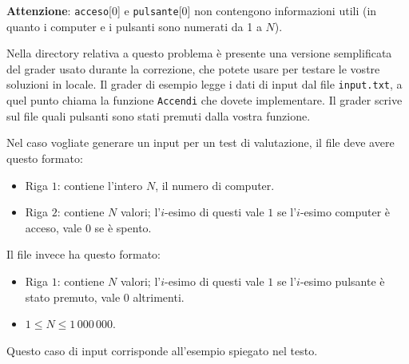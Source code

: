 \textbf{Attenzione}: \texttt{acceso}[0] e \texttt{pulsante}[0] non contengono informazioni utili (in quanto i computer e i pulsanti sono numerati da 1 a $N$).

\Grader
Nella directory relativa a questo problema è presente una versione 
semplificata del grader usato durante la correzione, che potete usare
per testare le vostre soluzioni in locale. Il grader di esempio legge
i dati di input dal file \texttt{input.txt}, a quel punto chiama la
funzione \texttt{Accendi} che dovete implementare. Il grader scrive sul file \outputfile{} quali pulsanti sono stati premuti dalla vostra funzione.

Nel caso vogliate generare un input per un test di valutazione, il file  deve avere questo formato:

\begin{itemize}[nolistsep,itemsep=2mm]
\item Riga $1$: contiene l'intero $N$, il numero di computer.
\item Riga $2$: contiene $N$ valori; l'$i$-esimo di questi vale $1$ se l'$i$-esimo computer è acceso, vale 0 se è spento.
\end{itemize}

Il file \outputfile{} invece ha questo formato:
\begin{itemize}[nolistsep,itemsep=2mm]
\item Riga $1$: contiene $N$ valori; l'$i$-esimo di questi vale $1$ se l'$i$-esimo pulsante è stato premuto, vale 0 altrimenti.
\end{itemize}

\Constraints 
\begin{itemize}[nolistsep,itemsep=2mm]
\item $1\le N \le 1\,000\,000$.
\end{itemize}

\Examples
\begin{example}
%
\end{example}

Questo caso di input corrisponde all'esempio spiegato nel testo.

